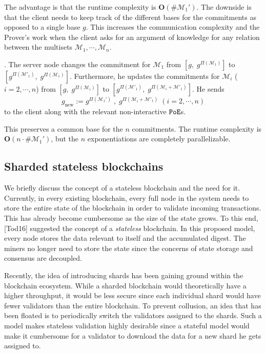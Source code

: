\documentclass[11pt, lettersize, notitlepage, leqno, footskip=0.6cm]{article}
\newcommand{\mc}{\mathcal}
\newcommand{\mbf}{\mathbf}
\newcommand{\mr}{\mathrm}
\newcommand{\vs}{\vspace{-0.15cm}}
\newcommand{\noin}{\noindent}
\numberwithin{equation}{section}
\begin{document}
The advantage is that the runtime complexity is $\mbf{O}(\#\mc{M}_1')$. The downside is that the client needs to keep track of the different bases for the commitments as opposed to a single base $g$. This increases the communication complexity and the Prover's work when the client asks for an argument of knowledge for any relation between the multisets $\mc{M}_1,\cdots,\mc{M}_n$. 

\vspace{0.1cm}

\noin 3. The server node changes the commitment for $\mc{M}_1$ from $[g,\; g^{\Pi(\mc{M}_1)}]$ to\\ $[g^{\Pi(\mc{M}'_1)},\; g^{\Pi(\mc{M}_1)}]$. Furthermore, he updates the commitments for $\mc{M}_i$ ($i=2,\cdots,n$) from $[g,\; g^{\Pi(\mc{M}_i)}]$ to $[g^{\Pi(\mc{M}'_1)},\; g^{\Pi(\mc{M}_i+\mc{M}'_1)}]$. He sends \vs $$g_{\mr{new}}:= g^{\Pi(\mc{M}_1')}\;,\;g^{\Pi(\mc{M}_i+\mc{M}'_1)}\;(i=2,\cdots,n)$$ to the client along with the relevant non-interactive $\tt{PoE}$s.

This preserves a common base for the $n$ commitments. The runtime complexity is $\mbf{O}(n\cdot \#\mc{M}_1')$, but the $n$ exponentiations are completely parallelizable.


\subsection{\fontsize{11}{11} \selectfont Sharded stateless blockchains}


We briefly discuss the concept of a stateless blockchain and the need for it. Currently, in every existing blockchain, every full node in the system needs to store the entire state of the blockchain in order to validate incoming transactions. This has already become cumbersome as the size of the state grows. To this end, [Tod16] suggested the concept of a \textit{stateless} blockchain. In this proposed model, every node stores the data relevant to itself and the accumulated digest. The miners no longer need to store the state since the concerns of state storage and consensus are decoupled.

Recently, the idea of introducing shards has been gaining ground within the blockchain ecosystem. While a sharded blockchain would theoretically have a higher throughput, it would be less secure since each individual shard would have fewer validators than the entire blockchain. To prevent collusion, an idea that has been floated is to periodically switch the validators assigned to the shards. Such a model makes stateless validation highly desirable since a stateful model would make it cumbersome for a validator to download the data for a new shard he gets assigned to.
\end{document}
